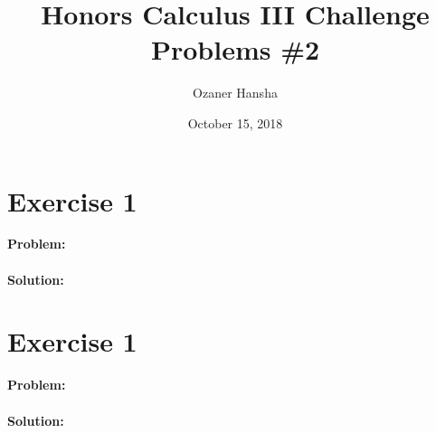 \documentclass{article}
\begin{document}
\title{Honors Calculus III Challenge Problems \#2}
\author{Ozaner Hansha}
\date{October 15, 2018}
\maketitle

\section*{Exercise 1}
\textbf{Problem:} 
\\\\
\textbf{Solution:}

\section*{Exercise 1}
\textbf{Problem:}
\\\\
\textbf{Solution:}
\end{document}
